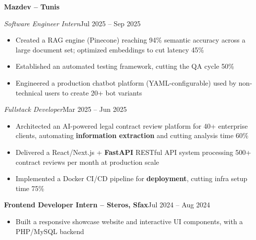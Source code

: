 \documentclass[10pt,a4paper]{article}
\newcommand{\entry}[2]{\vspace{1pt}\noindent\textbf{#1}\hfill{\color{muted}#2}\par}
\newcommand{\subentry}[2]{\noindent\textit{#1}\hfill{\color{muted}#2}\par}
\begin{document}
\entry{Mazdev -- Tunis}{}
\subentry{Software Engineer Intern}{Jul 2025 -- Sep 2025}
\begin{itemize}
  \item Created a RAG engine (Pinecone) reaching 94\% semantic accuracy across a large document set; optimized embeddings to cut latency 45\%
  \item Established an automated testing framework, cutting the QA cycle 50\%
  \item Engineered a production chatbot platform (YAML-configurable) used by non-technical users to create 20+ bot variants
\end{itemize}
\subentry{Fullstack Developer}{Mar 2025 -- Jun 2025}
\begin{itemize}
  \item Architected an AI-powered legal contract review platform for 40+ enterprise clients, automating \textbf{information extraction} and cutting analysis time 60\%
  \item Delivered a React/Next.js + \textbf{FastAPI} RESTful API system processing 500+ contract reviews per month at production scale
  \item Implemented a Docker CI/CD pipeline for \textbf{deployment}, cutting infra setup time 75\%
\end{itemize}

\entry{Frontend Developer Intern -- Steros, Sfax}{Jul 2024 -- Aug 2024}
\begin{itemize}
  \item Built a responsive showcase website and interactive UI components, with a PHP/MySQL backend
\end{itemize}
\end{document}
